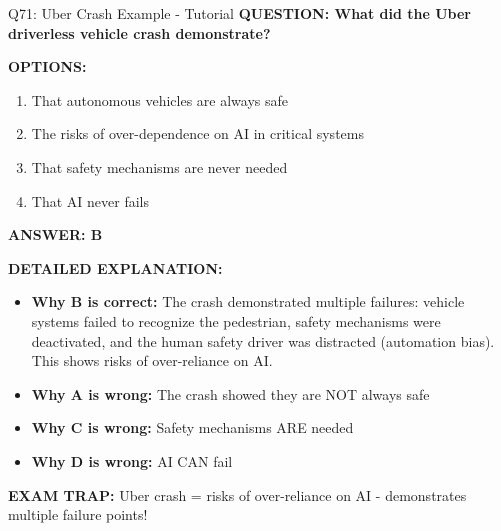 \documentclass[8pt]{beamer}
\begin{document}
	\begin{frame}{Q71: Uber Crash Example - Tutorial}
		\fontsize{6.5}{7.5}\selectfont
		\textbf{QUESTION: What did the Uber driverless vehicle crash demonstrate?}
		
		\vspace{0.1cm}
		\textbf{OPTIONS:}
		\begin{enumerate}
			\item That autonomous vehicles are always safe
			\item The risks of over-dependence on AI in critical systems
			\item That safety mechanisms are never needed
			\item That AI never fails
		\end{enumerate}
		
		\vspace{0.1cm}
		\textcolor{myblue}{\textbf{ANSWER: B}}
		
		\vspace{0.1cm}
		\textbf{DETAILED EXPLANATION:}
		\begin{itemize}
			\item \textbf{Why B is correct:} The crash demonstrated multiple failures: vehicle systems failed to recognize the pedestrian, safety mechanisms were deactivated, and the human safety driver was distracted (automation bias). This shows risks of over-reliance on AI.
			\item \textbf{Why A is wrong:} The crash showed they are NOT always safe
			\item \textbf{Why C is wrong:} Safety mechanisms ARE needed
			\item \textbf{Why D is wrong:} AI CAN fail
		\end{itemize}
		
		\textcolor{myred}{\textbf{EXAM TRAP:}} Uber crash = \textcolor{myblue}{risks of over-reliance on AI} - demonstrates multiple failure points!
	\end{frame}
	
\end{document}
